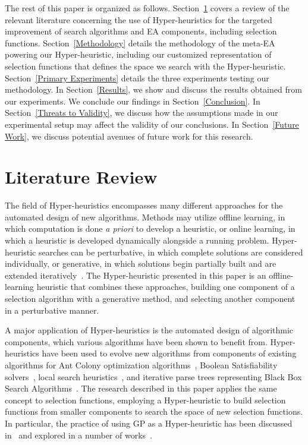 \documentclass[sigconf]{acmart}
\begin{document}
The rest of this paper is organized as follows. Section~\ref{Literature Review} covers a review of the relevant literature concerning the use of Hyper-heuristics for the targeted improvement of search algorithms and EA components, including selection functions. Section~\ref{Methodology} details the methodology of the meta-EA powering our Hyper-heuristic, including our customized representation of selection functions that defines the space we search with the Hyper-heuristic.  Section~\ref{Primary Experiments} details the three experiments testing our methodology. In Section~\ref{Results}, we show and discuss the results obtained from our experiments. We conclude our findings in Section~\ref{Conclusion}. In Section~\ref{Threats to Validity}, we discuss how the assumptions made in our experimental setup may affect the validity of our conclusions. In Section~\ref{Future Work}, we discuss potential avenues of future work for this research.

\section{Literature Review}
\label{Literature Review}
The field of Hyper-heuristics encompasses many different approaches for the automated design of new algorithms. Methods may utilize offline learning, in which computation is done \textit{a priori} to develop a heuristic, or online learning, in which a heuristic is developed dynamically alongside a running problem. Hyper-heuristic searches can be perturbative, in which complete solutions are considered individually, or generative, in which solutions begin partially built and are extended iteratively~\citep{burke2013HHstateoftheart}. The Hyper-heuristic presented in this paper is an offline-learning heuristic that combines these approaches, building one component of a selection algorithm with a generative method, and selecting another component in a perturbative manner.

A major application of Hyper-heuristics is the automated design of algorithmic components, which various algorithms have been shown to benefit from. Hyper-heuristics have been used to evolve new algorithms from components of existing algorithms for Ant Colony optimization algorithms~\citep{lopez2012antcol}, Boolean Satisfiability solvers~\citep{khudabukhsh2009satenstein}, local search heuristics~\citep{burke2012localHeuristics}, and iterative parse trees representing Black Box Search Algorithms~\citep{martin2013evolvingBBSA}. The research described in this paper applies the same concept to selection functions, employing a Hyper-heuristic to build selection functions from smaller components to search the space of new selection functions. In particular, the practice of using GP as a Hyper-heuristic has been discussed in~\citep{burke2009exploring} and explored in a number of works~\citep{burke2010strippacking, burke2006binpacking, harris2015comparison}. 
\end{document}
